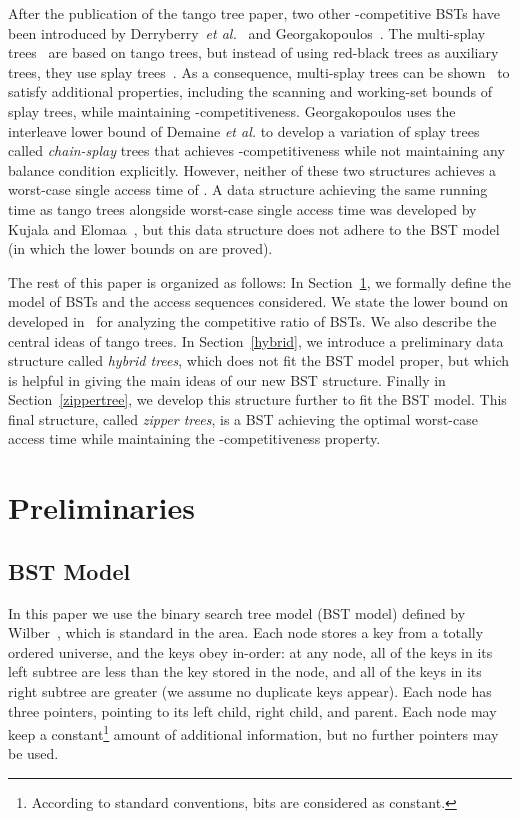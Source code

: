 \documentclass[letterpaper,11pt]{article}
\begin{document}
After the publication of the tango tree paper, two other -competitive BSTs have been introduced by Derryberry~\emph{et
al.}~\cite{multisplay,MultisplayThesis} and
Georgakopoulos~\cite{loglognsplay}.  The multi-splay
trees~\cite{multisplay} are based on tango trees, but instead of using
red-black trees as auxiliary trees, they use splay trees~\cite{splay}. As a
consequence, multi-splay trees can be
shown~\cite{multisplay,MultisplayThesis} to satisfy additional properties,
including the scanning and working-set bounds of splay trees, while
maintaining -competitiveness.  Georgakopoulos uses the
interleave lower bound of Demaine {\em et al.} to develop a variation of
splay trees called {\em chain-splay} trees that achieves -competitiveness while not maintaining any balance condition explicitly.
However, neither of these two structures achieves a worst-case single
access time of . A data structure achieving the same running
time as tango trees alongside  worst-case single access time was
developed by Kujala and Elomaa~\cite{poketree}, but this data structure
does not adhere to the BST model (in which the lower bounds on  are proved).

The rest of this paper is organized as follows: In
Section~\ref{preliminaries}, we formally define the model of BSTs
and the access sequences considered. We state the lower bound on  developed in~\cite{tango,wilber} for analyzing the competitive
ratio of BSTs. We also describe the central ideas of tango trees.  In
Section~\ref{hybrid}, we introduce a preliminary data structure called
\emph{hybrid trees}, which does not fit the BST model proper, but which is
helpful in giving the main ideas of our new BST structure. Finally in
Section~\ref{zippertree}, we develop this structure further to fit the BST
model. This final structure, called \emph{zipper trees}, is a BST achieving
the optimal worst-case access time while maintaining the -competitiveness property.



\section{Preliminaries}
\label{preliminaries}

\subsection{BST Model}
\label{model}
In this paper we use the binary search tree model (BST model) defined
by Wilber~\cite{wilber}, which is standard in the area.  Each node stores a
key from a totally ordered universe, and the keys obey in-order: at any
node, all of the keys in its left subtree are less than the key stored in
the node, and all of the keys in its right subtree are greater (we assume
no duplicate keys appear). Each node has three pointers, pointing to its
left child, right child, and parent. Each node may keep a
constant\footnote{According to standard conventions,  bits are
considered as constant.}  amount of additional information, but no further
pointers may be used.
\end{document}
